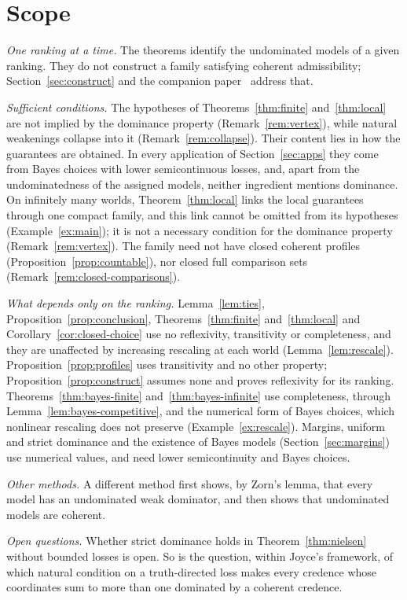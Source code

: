 \documentclass[11pt]{article}
\theoremstyle{definition}
\theoremstyle{remark}
\begin{document}
\section{Scope}\label{sec:scope}
\emph{One ranking at a time.} The theorems identify the undominated models of a given ranking. They do not construct a family satisfying coherent admissibility; Section~\ref{sec:construct} and the companion paper~\cite{KCM} address that.

\emph{Sufficient conditions.} The hypotheses of Theorems~\ref{thm:finite} and~\ref{thm:local} are not implied by the dominance property (Remark~\ref{rem:vertex}), while natural weakenings collapse into it (Remark~\ref{rem:collapse}). Their content lies in how the guarantees are obtained. In every application of Section~\ref{sec:apps} they come from Bayes choices with lower semicontinuous losses, and, apart from the undominatedness of the assigned models, neither ingredient mentions dominance. On infinitely many worlds, Theorem~\ref{thm:local} links the local guarantees through one compact family, and this link cannot be omitted from its hypotheses (Example~\ref{ex:main}); it is not a necessary condition for the dominance property (Remark~\ref{rem:vertex}). The family need not have closed coherent profiles (Proposition~\ref{prop:countable}), nor closed full comparison sets (Remark~\ref{rem:closed-comparisons}).

\emph{What depends only on the ranking.} Lemma~\ref{lem:ties}, Proposition~\ref{prop:conclusion}, Theorems~\ref{thm:finite} and~\ref{thm:local} and Corollary~\ref{cor:closed-choice} use no reflexivity, transitivity or completeness, and they are unaffected by increasing rescaling at each world (Lemma~\ref{lem:rescale}). Proposition~\ref{prop:profiles} uses transitivity and no other property; Proposition~\ref{prop:construct} assumes none and proves reflexivity for its ranking. Theorems~\ref{thm:bayes-finite} and~\ref{thm:bayes-infinite} use completeness, through Lemma~\ref{lem:bayes-competitive}, and the numerical form of Bayes choices, which nonlinear rescaling does not preserve (Example~\ref{ex:rescale}). Margins, uniform and strict dominance and the existence of Bayes models (Section~\ref{sec:margins}) use numerical values, and need lower semicontinuity and Bayes choices.

\emph{Other methods.} A different method first shows, by Zorn's lemma, that every model has an undominated weak dominator, and then shows that undominated models are coherent.

\emph{Open questions.} Whether strict dominance holds in Theorem~\ref{thm:nielsen} without bounded losses is open. So is the question, within Joyce's framework, of which natural condition on a truth-directed loss makes every credence whose coordinates sum to more than one dominated by a coherent credence.
\end{document}
